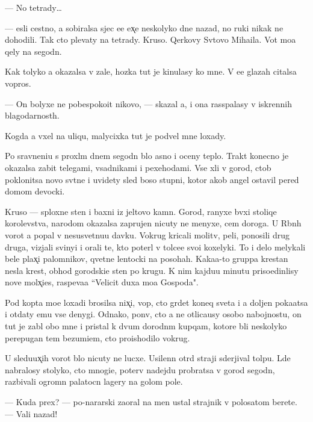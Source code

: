 \documentclass[10pt]{book}
\begin{document}
— No tetrady…

— {\Y}esli cestno, {\y}a sobiralsa sjec {\y}e{\y}e {\y}ex̨e neskolyko dne{\y} nazad, no ruki nikak ne dohodili. Tak cto plevaty na tetrady. Kruso. Qerkovy Sv{\ia}tovo Miha{\y}ila. Vot mo{\y}a qely na segodn{\ia}.

Kak tolyko {\y}a okazalsa v zale, hoz{\ia}{\y}ka tut je kinulasy ko mne. V {\y}e{\y}e glazah citalsa vopros.

— On bolyxe ne pobespoko{\y}it nikovo, — skazal {\y}a, i ona rass{\yi}palasy v iskrennih blagodarnost{\ia}h.

Kogda {\y}a v{\yi}xel na uliqu, malycixka tut je podvel mne loxady.

Po sravneni{\y}u s proxl{\yi}m dnem segodn{\ia} b{\yi}lo {\y}asno i oceny teplo. Trakt konecno je okazalsa zabit telegami, vsadnikami i pexehodami. Vse xli v gorod, ctob{\yi} poklonitsa novo{\y} sv{\ia}t{\yi}ne i uvidety sled boso{\y} stupni, kotor{\yi}{\y} {\y}akob{\yi} angel ostavil pered domom devocki.

Kruso — sploxn{\yi}{\y}e sten{\yi} i baxni iz jeltovo kamn{\ia}. Gorod, ranyxe b{\yi}vxi{\y} stoliqe{\y} korolevstva, narodom okazalsa zaprujen nicuty ne menyxe, cem doroga. U R{\yi}bn{\yi}h vorot {\y}a popal v nesusvetnu{\y}u davku. Vokrug kricali molitv{\yi}, peli, ponosili drug druga, vizjali svinyi i orali te, kto poter{\ia}l v tolce{\y}e svo{\y}i koxelyki. To i delo melykali bel{\yi}{\y}e plax̨i palomnikov, qvetn{\yi}{\y}e lentocki na posohah. Kaka{\y}a-to gruppa krest{\y}an nesla krest, obhod{\ia} gorodski{\y}e sten{\yi} po krugu. K nim kajdu{\y}u minutu priso{\y}edin{\ia}lisy nov{\yi}{\y}e mol{\ia}x̨i{\y}es{\ia}, raspeva{\y}a ``Velicit duxa mo{\y}a Gospoda".

Pod kop{\yi}ta mo{\y}e{\y} loxadi brosilsa nix̨i{\y}, vop{\ia}, cto gr{\ia}det koneq sveta i {\y}a doljen poka{\y}atsa i otdaty {\y}emu vse denygi. Odnako, pon{\ia}v, cto {\y}a ne otlica{\y}usy osobo{\y} nabojnost{\y}u, on tut je zab{\yi}l obo mne i pristal k dvum dorodn{\yi}m kupqam, kotor{\yi}{\y}e b{\yi}li neskolyko perepugan{\yi} tem bezumi{\y}em, cto pro{\y}ishodilo vokrug.

U sledu{\y}ux̨ih vorot b{\yi}lo nicuty ne lucxe. Usilenn{\yi}{\y} otr{\ia}d straji sderjival tolpu. L{\iu}de{\y} nabralosy stolyko, cto mnogi{\y}e, poter{\ia}v nadejdu probratsa v gorod segodn{\ia}, razbivali ogromn{\yi}{\y} palatocn{\yi}{\y} lagery na golom pole.

— Kuda prex? — po-nararski zaoral na men{\ia} ustal{\yi}{\y} strajnik v polosatom berete. — Vali nazad!
\end{document}
